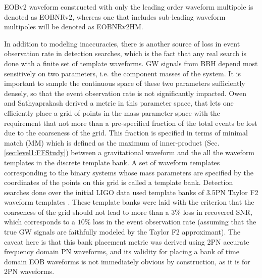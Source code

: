 \documentclass[aps,
prd,
amsmath,
amssymb,
twocolumn,
floatfix,
groupedaddress]{revtex4-1}
\newcommand{\MM}{\mathrm{MM}}
\begin{document}
EOBv2 waveform constructed with only the leading order waveform multipole is denoted as EOBNRv2, whereas one that includes sub-leading waveform multipoles will be denoted as EOBNRv2HM.

In addition to modeling inaccuracies, there is another source of loss in event observation rate in detection searches, which is the fact that any real search is done with a finite set of template waveforms. GW signals from BBH depend most sensitively on two parameters, i.e. the component masses of the system. It is important to sample the continuous space of these two parameters sufficiently densely, so that the event observation rate is not significantly impacted. Owen \citep{OwenTemplateSpacing} and Sathyaprakash \citep{SathyaMetric2PN,SathyaBankPlacementTauN} derived a metric in this parameter space, that lets one efficiently place a grid of points in the mass-parameter space with the requirement that not more than a pre-specified fraction of the total events be lost due to the coarseness of the grid. This fraction is specified in terms of minimal match ($\MM$) which is defined as the maximum of inner-product (Sec.\ref{sec:level1:FFStudy}) between a gravitational waveform and the all the waveform templates in the discrete template bank. A set of waveform templates corresponding to the binary systems whose mass parameters are specified by the coordinates of the points on this grid is called a template bank. Detection searches done over the initial LIGO data used template banks of 3.5PN Taylor F2 waveform templates \citep{LSCSearch2004,LSCSearch2005,LSCSearch2008}. These template banks were laid with the criterion that the coarseness of the grid should not lead to more than a $3\%$ loss in recovered SNR, which corresponds to a $10\%$ loss in the event observation rate (assuming that the true GW signals are faithfully modeled by the Taylor F2 approximant). The caveat here is that this bank placement metric was derived using 2PN accurate frequency domain PN waveforms, and its validity for placing a bank of time domain EOB waveforms is not immediately obvious by construction, as it is for 2PN waveforms.
\end{document}
